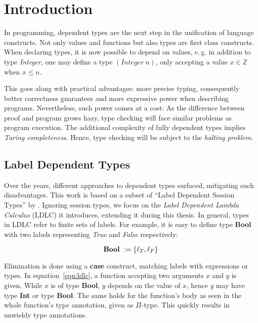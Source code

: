 \chapter{Introduction}\label{chap:introduction}

In programming, dependent types are the next step in the unification of language constructs. Not only values and functions but also types are first class constructs. When declaring types, it is now possible to depend on values, e.\,g. in addition to type \emph{Integer}, one may define a type $(Integer~n)$, only accepting a value $x \in \mathbb{Z}$ when $x \leq n$.

This goes along with practical advantages: more precise typing, consequently better correctness guarantees and more expressive power when describing programs. Nevertheless, such power comes at a cost: As the difference between proof and program grows hazy, type checking will face similar problems as program execution. The additional complexity of fully dependent types implies \emph{Turing completeness}. Hence, type checking will be subject to the \emph{halting problem}.

\section{Label Dependent Types}

Over the years, different approaches to dependent types surfaced, mitigating such disadvantages. This work is based on a subset of ``Label Dependent Session Types'' by \cite{thiemann2019}. Ignoring session types, we focus on the \emph{Label Dependent Lambda Calculus} (LDLC) it introduces, extending it during this thesis. In general, types in LDLC refer to finite sets of labels. For example, it is easy to define type \textbf{Bool} with two labels representing \emph{True} and \emph{False} respectively:

\begin{equation}\label{eqn:bool}
\text{ \textbf{Bool} }    := \{\ell_{T}, \ell_{F}\}
\end{equation}

Elimination is done using a \textbf{case} construct, matching labels with expressions or types. In equation~\ref{eqn:ldlc}, a function accepting two arguments $x$ and $y$ is given. While $x$ is of type \textbf{Bool}, $y$ depends on the value of $x$, hence $y$ may have type \textbf{Int} or type \textbf{Bool}. The same holds for the function's body as seen in the whole function's type annotation, given as $\Pi$-type. This quickly results in unwieldy type annotations.

